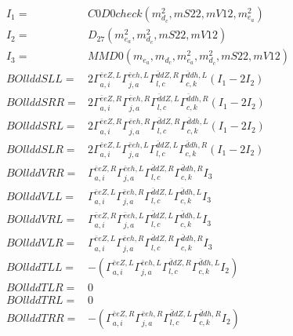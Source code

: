 \documentclass[A4,landscape]{article}
\begin{document}
\begin{align} 
I_1 = & C0D0check(m^2_{d_{{c}}}, mS22, mV12, m^2_{e_{{a}}}) \\ 
I_2 = & D_{27}(m^2_{e_{{a}}}, m^2_{d_{{c}}}, mS22, mV12) \\ 
I_3 = & MMD0(m_{e_{{a}}}, m_{d_{{c}}}, m^2_{e_{{a}}}, m^2_{d_{{c}}}, mS22, mV12) \\ 
  BOllddSLL= & 2  \Gamma^{\bar{e}e Z ,L}_{a, i} \Gamma^{\bar{e}e h ,L}_{j, a} \Gamma^{\bar{d}d Z ,R}_{l, c} \Gamma^{\bar{d}d h ,L}_{c, k} (I_1 - 2 I_2) \\ 
  BOllddSRR= & 2  \Gamma^{\bar{e}e Z ,R}_{a, i} \Gamma^{\bar{e}e h ,R}_{j, a} \Gamma^{\bar{d}d Z ,L}_{l, c} \Gamma^{\bar{d}d h ,R}_{c, k} (I_1 - 2 I_2) \\ 
  BOllddSRL= & 2  \Gamma^{\bar{e}e Z ,R}_{a, i} \Gamma^{\bar{e}e h ,R}_{j, a} \Gamma^{\bar{d}d Z ,R}_{l, c} \Gamma^{\bar{d}d h ,L}_{c, k} (I_1 - 2 I_2) \\ 
  BOllddSLR= & 2  \Gamma^{\bar{e}e Z ,L}_{a, i} \Gamma^{\bar{e}e h ,L}_{j, a} \Gamma^{\bar{d}d Z ,L}_{l, c} \Gamma^{\bar{d}d h ,R}_{c, k} (I_1 - 2 I_2) \\ 
  BOllddVRR= &  \Gamma^{\bar{e}e Z ,R}_{a, i} \Gamma^{\bar{e}e h ,L}_{j, a} \Gamma^{\bar{d}d Z ,R}_{l, c} \Gamma^{\bar{d}d h ,R}_{c, k} I_3 \\ 
  BOllddVLL= &  \Gamma^{\bar{e}e Z ,L}_{a, i} \Gamma^{\bar{e}e h ,R}_{j, a} \Gamma^{\bar{d}d Z ,L}_{l, c} \Gamma^{\bar{d}d h ,L}_{c, k} I_3 \\ 
  BOllddVRL= &  \Gamma^{\bar{e}e Z ,R}_{a, i} \Gamma^{\bar{e}e h ,L}_{j, a} \Gamma^{\bar{d}d Z ,L}_{l, c} \Gamma^{\bar{d}d h ,L}_{c, k} I_3 \\ 
  BOllddVLR= &  \Gamma^{\bar{e}e Z ,L}_{a, i} \Gamma^{\bar{e}e h ,R}_{j, a} \Gamma^{\bar{d}d Z ,R}_{l, c} \Gamma^{\bar{d}d h ,R}_{c, k} I_3 \\ 
  BOllddTLL= & -( \Gamma^{\bar{e}e Z ,L}_{a, i} \Gamma^{\bar{e}e h ,L}_{j, a} \Gamma^{\bar{d}d Z ,R}_{l, c} \Gamma^{\bar{d}d h ,L}_{c, k} I_2) \\ 
  BOllddTLR= & 0 \\ 
  BOllddTRL= & 0 \\ 
  BOllddTRR= & -( \Gamma^{\bar{e}e Z ,R}_{a, i} \Gamma^{\bar{e}e h ,R}_{j, a} \Gamma^{\bar{d}d Z ,L}_{l, c} \Gamma^{\bar{d}d h ,R}_{c, k} I_2) \\ 
\end{align} 
\end{document}
